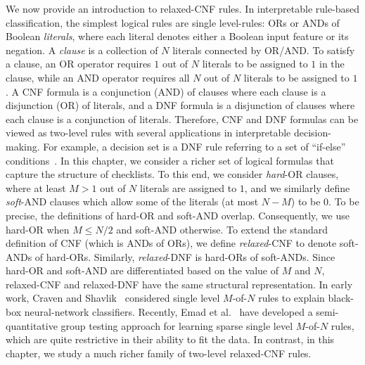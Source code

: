 We now provide an introduction to relaxed-CNF rules. In interpretable rule-based classification, the simplest logical rules are single level-rules: ORs or ANDs of Boolean \textit{literals}, where each literal denotes either a Boolean input feature or its negation. A \emph{clause} is a collection of $ N $ literals connected by  OR/AND. To satisfy a clause, an OR operator requires $ 1 $ out of $ N $ literals to be assigned to  $ 1 $ in the clause, while an AND operator requires all $N$ out of $N$ literals to be assigned to  $ 1 $. A CNF   formula  is a conjunction (AND) of {clauses} where each clause is a disjunction (OR) of {literals}, and  a DNF  formula is a disjunction of clauses where each clause is a conjunction of literals. Therefore, CNF  and DNF  formulas can be viewed as two-level rules with several applications in interpretable decision-making. For example, a decision set is a DNF rule referring to a set of ``if-else'' conditions~\cite{ignatiev2018sat,lakkaraju2016interpretable}.  In this chapter, we consider a richer set of logical formulas that capture the structure of checklists. To this end, we consider \emph{hard}-OR clauses, where at least $ M > 1$ out of $ N $ literals are assigned to $ 1 $, and we similarly define {\emph{soft}-AND} clauses which allow some of the literals (at most $ N-M $) to be $ 0 $. To be precise,  the definitions of hard-OR and soft-AND overlap. Consequently, we use hard-OR when $M \le N/2$ and soft-AND otherwise. To extend the standard definition of CNF (which is ANDs of ORs),  we define \emph{relaxed}-CNF to denote soft-ANDs of hard-ORs. Similarly, \emph{relaxed}-DNF is hard-ORs of soft-ANDs. Since   hard-OR and soft-AND are differentiated based on the value of $ M $ and $ N $, relaxed-CNF and relaxed-DNF have the same structural representation. In early work, Craven and Shavlik~\cite{craven1996extracting} considered single level $ M $-of-$ N $ rules to explain black-box neural-network classifiers. Recently, Emad et al.~\cite{EVM2015} have developed a semi-quantitative group testing approach for learning sparse single level $M$-of-$N$ rules, which are quite restrictive in their ability to fit the data. In contrast, in this chapter, we study a much richer family of two-level relaxed-CNF rules. 






